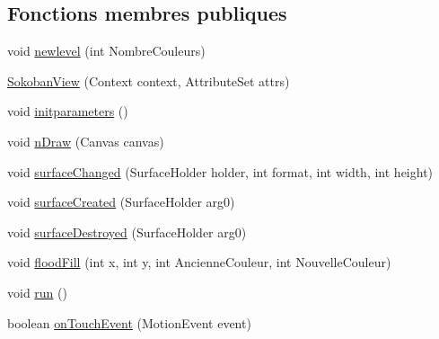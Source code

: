 \subsection*{Fonctions membres publiques}
\begin{DoxyCompactItemize}
\item 
void \hyperlink{classp8_1_1demo_1_1p8sokoban_1_1_sokoban_view_a589ccb831a549d7c328418e038c7bb4c}{newlevel} (int Nombre\+Couleurs)
\item 
\hyperlink{classp8_1_1demo_1_1p8sokoban_1_1_sokoban_view_a9b77c402af6779c46c11e0bd6572eeec}{Sokoban\+View} (Context context, Attribute\+Set attrs)
\item 
void \hyperlink{classp8_1_1demo_1_1p8sokoban_1_1_sokoban_view_aae2d77f292a6cc7b5e4b68f0c8df0243}{initparameters} ()
\item 
void \hyperlink{classp8_1_1demo_1_1p8sokoban_1_1_sokoban_view_a162eb9585b545f2c922d6d2aba411d68}{n\+Draw} (Canvas canvas)
\item 
void \hyperlink{classp8_1_1demo_1_1p8sokoban_1_1_sokoban_view_a6f555dde84f49e730114c5585e444e2b}{surface\+Changed} (Surface\+Holder holder, int format, int width, int height)
\item 
void \hyperlink{classp8_1_1demo_1_1p8sokoban_1_1_sokoban_view_a4b9325992cfbf98b878f11b75909edac}{surface\+Created} (Surface\+Holder arg0)
\item 
void \hyperlink{classp8_1_1demo_1_1p8sokoban_1_1_sokoban_view_a0b190fc3dd3e36091c512adb6d827172}{surface\+Destroyed} (Surface\+Holder arg0)
\item 
void \hyperlink{classp8_1_1demo_1_1p8sokoban_1_1_sokoban_view_a2978b3f19073d8b08ec5ad612dd1be23}{flood\+Fill} (int x, int y, int Ancienne\+Couleur, int Nouvelle\+Couleur)
\item 
void \hyperlink{classp8_1_1demo_1_1p8sokoban_1_1_sokoban_view_a6c6c4a3e01b49c9b46fbf698eda4ad5a}{run} ()
\item 
boolean \hyperlink{classp8_1_1demo_1_1p8sokoban_1_1_sokoban_view_a7447a5c085cc25b6be162b832a358700}{on\+Touch\+Event} (Motion\+Event event)
\end{DoxyCompactItemize}
